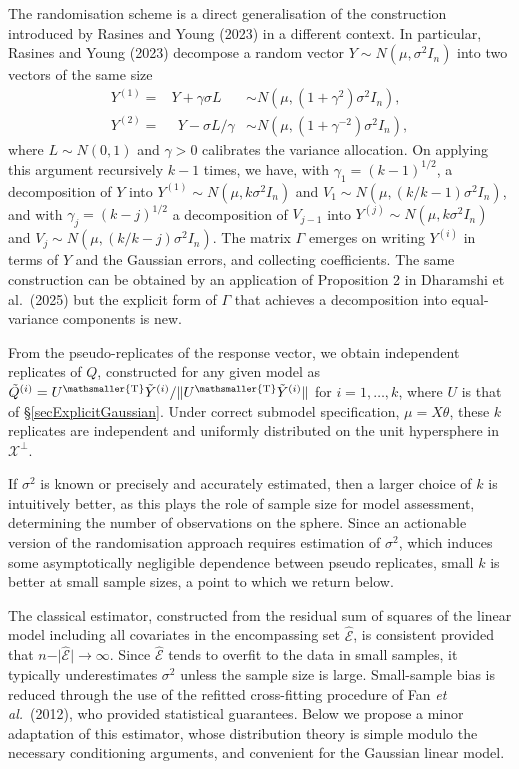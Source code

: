 \documentclass[10pt, reqno]{amsart}
\numberwithin{equation}{section}
\newcommand{\T}{{\mathsmaller {\rm T}}}
\begin{document}
The randomisation scheme is a direct generalisation of the construction introduced by Rasines and Young (2023) in a different context. In particular, Rasines and Young (2023) decompose a random vector $Y\sim N(\mu, \sigma^2 I_n)$ into two vectors of the same size
\begin{eqnarray*}
	Y^{(1)} =& Y + \gamma \sigma L  &\sim  N(\mu, (1+\gamma^2)\sigma^2I_n), \\
	Y^{(2)} =& \;\,Y - \sigma L/\gamma &\sim  N(\mu, (1+\gamma^{-2})\sigma^2I_n), 
\end{eqnarray*}
where $L\sim N(0, 1)$ and $\gamma > 0$ calibrates the variance allocation. On applying this argument recursively $k-1$ times, we have, with $\gamma_1 = (k-1)^{1/2}$, a decomposition of $Y$ into $Y^{(1)} \sim N(\mu, k \sigma^2I_n)$ and $V_1 \sim N(\mu, (k/k-1) \sigma^2I_n)$, and with $\gamma_j = (k-j)^{1/2}$ a decomposition of $V_{j-1}$ into $Y^{(j)}\sim N(\mu, k \sigma^2 I_n)$ and $V_j \sim N(\mu, (k/k-j) \sigma^2I_n)$. The matrix $\Gamma$ emerges on writing $Y^{(i)}$ in terms of $Y$ and the Gaussian errors, and collecting coefficients. The same construction can be obtained by an application of Proposition 2 in Dharamshi et al.~(2025) but the explicit form of $\Gamma$ that achieves a decomposition into equal-variance components is new.

From the pseudo-replicates of the response vector, we obtain independent replicates of $Q$, constructed for any given model as $\tilde Q^{(i)}=U^\T\tilde Y^{(i)}/\|U^\T\tilde Y^{(i)}\|$ for $i = 1, \ldots,k$, where $U$ is that of \S \ref{secExplicitGaussian}. Under correct submodel specification, $\mu = X\theta$, these $k$ replicates are independent and uniformly distributed on the unit hypersphere in $\mathcal{X}^\perp$.

If $\sigma^2$ is known or precisely and accurately estimated, then a larger choice of $k$ is intuitively better, as this plays the role of sample size for model assessment, determining the number of observations on the sphere. Since an actionable version of the randomisation approach requires estimation of $\sigma^2$, which induces some asymptotically negligible dependence between pseudo replicates, small $k$ is better at small sample sizes, a point to which we return below.

The classical estimator, constructed from the residual sum of squares of the linear model including all covariates in the encompassing set $\hat{\mathcal{E}}$, is consistent provided that $n - \vert \hat{\mathcal{E}} \vert \to \infty$. Since $\hat{\mathcal{E}}$ tends to overfit to the data  in small samples, it typically underestimates $\sigma^2$ unless the sample size is large. Small-sample bias is reduced through the use of the refitted cross-fitting procedure of Fan \emph{et al.}~(2012), who provided statistical guarantees. Below we propose a minor adaptation of this estimator, whose distribution theory is simple modulo the necessary conditioning arguments, and convenient for the Gaussian linear model. 
\end{document}
